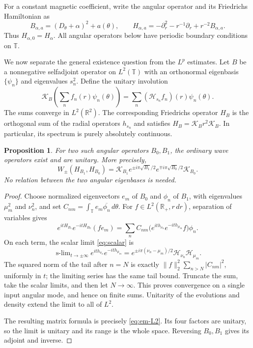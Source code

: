 \documentclass[11pt,a4paper,reqno,backref=page]{amsart}
\newcommand{\R}{\mathbb R}
\newcommand{\T}{\mathbb T}
\newcommand{\HH}{\mathcal H}                 %
\DeclareMathOperator*{\slim}{s\text{-}lim}
\numberwithin{equation}{section}
\newtheorem{proposition}[theorem]{Proposition}
\theoremstyle{definition}
\theoremstyle{remark}
\begin{document}
For a constant magnetic coefficient, write the angular
operator and its Friedrichs Hamiltonian as
\begin{equation}\label{eq:em-H}
  B_{\alpha,a}=(D_\theta+\alpha)^2+a(\theta),
  \qquad
  H_{\alpha,a}=-\partial_r^2-r^{-1}\partial_r
  +r^{-2}B_{\alpha,a}.
\end{equation}
Thus $H_{\alpha,0}=H_\alpha$. All angular operators below have
periodic boundary conditions on $\T$.

We now separate the general existence question from the
$L^p$ estimates. Let $B$ be a nonnegative selfadjoint
operator on $L^2(\T)$ with an orthonormal eigenbasis
$\{\psi_n\}$ and
eigenvalues $s_n^2$. Define the unitary involution
\begin{equation}\label{eq:em-K}
  \mathcal K_B\left(\sum_n f_n(r)\psi_n(\theta)\right)
  =\sum_n(\HH_{s_n}f_n)(r)\psi_n(\theta).
\end{equation}
The sums converge in $L^2(\R^2)$. The corresponding Friedrichs
operator $H_B$ is the orthogonal sum of the radial operators
$h_{s_n}$ and satisfies $H_B=\mathcal K_B r^2\mathcal K_B$.
In particular, its spectrum is purely absolutely continuous.

\begin{proposition}\label{prop:em-L2}
  For two such angular operators $B_0,B_1$, the ordinary
  wave operators exist and are unitary. More precisely,
  \begin{equation}\label{eq:em-L2}
    W_\pm(H_{B_1},H_{B_0})
    =\mathcal K_{B_1}e^{\pm i\pi\sqrt{B_1}/2}
    e^{\mp i\pi\sqrt{B_0}/2}\mathcal K_{B_0}.
  \end{equation}
  No relation between the two angular eigenbases is needed.
\end{proposition}

\begin{proof}
  Choose normalized eigenvectors $e_m$ of $B_0$ and $\phi_n$
  of $B_1$, with eigenvalues $\mu_m^2$ and $\nu_n^2$, and set
  $C_{nm}=\int_\T e_m\overline{\phi_n}\,d\theta$. For
  $f\in L^2(\R_+,r\,dr)$, separation of variables gives
  \begin{equation*}
    e^{itH_{B_1}}e^{-itH_{B_0}}(fe_m)
    =\sum_n C_{nm}
    \bigl(e^{ith_{\nu_n}}e^{-ith_{\mu_m}}f\bigr)\phi_n.
  \end{equation*}
  On each term, the scalar limit \eqref{eq:scalar} is
  \begin{equation*}
    \slim_{t\to\pm\infty}
    e^{ith_{\nu_n}}e^{-ith_{\mu_m}}
    =e^{\pm i\pi(\nu_n-\mu_m)/2}
    \HH_{\nu_n}\HH_{\mu_m}.
  \end{equation*}
  The squared norm of the tail after $n=N$ is exactly
  $\|f\|_2^2\sum_{n>N}|C_{nm}|^2$, uniformly in $t$; the
  limiting series has the same tail bound. Truncate the sum,
  take the scalar limits, and then let $N\to\infty$.
  This proves convergence on a single input angular mode,
  and hence on finite sums. Unitarity of the evolutions and
  density extend the limit to all of $L^2$.

  The resulting matrix formula is precisely
  \eqref{eq:em-L2}. Its four factors are unitary, so the
  limit is unitary and its range is the whole space. Reversing
  $B_0,B_1$ gives its adjoint and inverse.
\end{proof}
\end{document}
